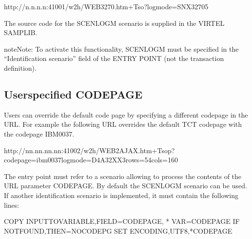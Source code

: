 \documentclass[letterpaper,10pt,english]{sphinxmanual}
\begin{document}
\begin{sphinxVerbatim}[commandchars=\\\{\}]
http://n.n.n.n:41001/w2h/WEB3270.htm+Tso?logmode=SNX32705
\end{sphinxVerbatim}

\sphinxAtStartPar
The source code for the SCENLOGM scenario is supplied in the VIRTEL SAMPLIB.

\begin{sphinxadmonition}{note}{Note:}
\sphinxAtStartPar
To activate this functionality, SCENLOGM must be specified in the “Identification scenario” field of the ENTRY POINT (not the transaction definition).
\end{sphinxadmonition}

\ignorespaces 

\subsection{User\sphinxhyphen{}specified CODEPAGE}
\label{\detokenize{Customization:user-specified-codepage}}\label{\detokenize{Customization:index-64}}
\sphinxAtStartPar
Users can override the default code page by specifying a different codepage in the URL. For example the following URL overrides the default TCT codepage with the codepage IBM0037.

\begin{sphinxVerbatim}[commandchars=\\\{\}]
http://nn.nn.nn.nn:41002/w2h/WEB2AJAX.htm+Tsop?codepage=ibm0037\PYGZam{}logmode=D4A32XX3\PYGZam{}rows=54\PYGZam{}cols=160
\end{sphinxVerbatim}

\sphinxAtStartPar
The entry point must refer to a scenario allowing to process the contents of the URL parameter CODEPAGE. By default the SCENLOGM scenario can be used. If another identification scenario is implemented, it must contain the following lines:

\begin{sphinxVerbatim}[commandchars=\\\{\}]
COPY\PYGZdl{} INPUT\PYGZhy{}TO\PYGZhy{}VARIABLE,FIELD=\PYGZsq{}CODEPAGE\PYGZsq{}, *
        VAR=\PYGZsq{}CODEPAGE\PYGZsq{}
IF\PYGZdl{} NOT\PYGZhy{}FOUND,THEN=NOCODEPG
SET\PYGZdl{} ENCODING,UTF\PYGZhy{}8,\PYGZsq{}*CODEPAGE\PYGZsq{}
\end{sphinxVerbatim}
\end{document}
